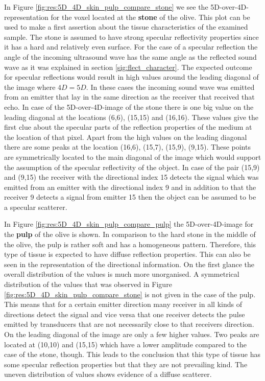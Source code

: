 In Figure \ref{fig:res:5D_4D_skin_pulp_compare_stone} we see the 5D-over-4D-representation for the voxel located at the \textbf{stone} of the olive. This plot can be used to make a first assertion about the tissue characteristics of the examined sample. The stone is assumed to have strong specular reflectivity properties since it has a hard and relatively even surface.
For the case of a specular reflection the angle of the incoming ultrasound wave has the same angle as the reflected sound wave as it was explained in section \ref{sig:flect_character}. The expected outcome for specular reflections would result in high values around the leading diagonal of the image where $4D = 5D$. In these cases the incoming sound wave was emitted from an emitter that lay in the same direction as the receiver that received that echo. In case of the 5D-over-4D-image of the stone there is one big value on the leading diagonal at the locations (6,6), (15,15) and (16,16). These values give the first clue about the specular parts of the reflection properties of the medium at the location of that pixel.
Apart from the high values on the leading diagonal there are some peaks at the location (16,6), (15,7), (15,9), (9,15). These points are symmetrically located to the main diagonal of the image which would support the assumption of the specular reflectivity of the object. In case of the pair (15,9) and (9,15) the receiver with the directional index 15 detects the signal which was emitted from an emitter with the directional index 9 and in addition to that the receiver 9 detects a signal from emitter 15 then the object can be assumed to be a specular scatterer. 

\medskip

In Figure \ref{fig:res:5D_4D_skin_pulp_compare_pulp} the 5D-over-4D-image for the \textbf{pulp} of the olive is shown. In comparison to the hard stone in the middle of the olive, the pulp is rather soft and has a homogeneous pattern. Therefore, this type of tissue is expected to have diffuse reflection properties. This can also be seen in the representation of the directional information. On the first glance the overall distribution of the values is much more unorganised. A symmetrical distribution of the values that was observed in Figure  \ref{fig:res:5D_4D_skin_pulp_compare_stone} is not given in the case of the pulp. This means that for a certain emitter direction many receiver in all kinds of directions detect the signal and vice versa that one receiver detects the pulse emitted by transducers that are not necessarily close to that receivers direction. On the leading diagonal of the image are only a few higher values. Two peaks are located at (10,10) and (15,15) which have a lower amplitude compared to the case of the stone, though. This leads to the conclusion that this type of tissue has some specular reflection properties but that they are not prevailing kind. The uneven distribution of values shows evidence of a diffuse scatterer. 

